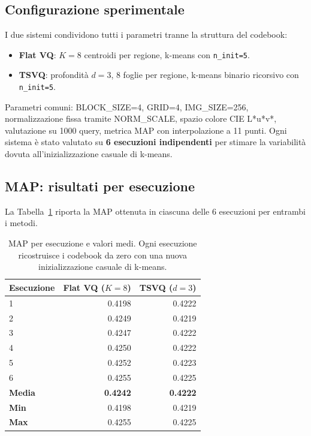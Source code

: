 \documentclass[12pt, a4paper]{article}
\begin{document}
\subsection{Configurazione sperimentale}

I due sistemi condividono tutti i parametri tranne la struttura del codebook:
\begin{itemize}
    \item \textbf{Flat VQ}: $K=8$ centroidi per regione, k-means con \texttt{n\_init=5}.
    \item \textbf{TSVQ}: profondità $d=3$, 8 foglie per regione, k-means binario ricorsivo
          con \texttt{n\_init=5}.
\end{itemize}
Parametri comuni: BLOCK\_SIZE=4, GRID=4, IMG\_SIZE=256, normalizzazione fissa tramite
NORM\_SCALE, spazio colore CIE L*u*v*, valutazione su 1000 query, metrica MAP con
interpolazione a 11 punti. Ogni sistema è stato valutato su \textbf{6 esecuzioni
indipendenti} per stimare la variabilità dovuta all'inizializzazione casuale di k-means.

\subsection{MAP: risultati per esecuzione}

La Tabella~\ref{tab:map_runs} riporta la MAP ottenuta in ciascuna delle 6 esecuzioni
per entrambi i metodi.

\begin{table}[H]
\centering
\begin{tabular}{lrr}
\toprule
\textbf{Esecuzione} & \textbf{Flat VQ ($K=8$)} & \textbf{TSVQ ($d=3$)} \\
\midrule
1 & 0.4198 & 0.4222 \\
2 & 0.4249 & 0.4219 \\
3 & 0.4247 & 0.4222 \\
4 & 0.4250 & 0.4222 \\
5 & 0.4252 & 0.4223 \\
6 & 0.4255 & 0.4225 \\
\midrule
\textbf{Media}  & \textbf{0.4242} & \textbf{0.4222} \\
\textbf{Min}    & 0.4198          & 0.4219 \\
\textbf{Max}    & 0.4255          & 0.4225 \\
\bottomrule
\end{tabular}
\caption{MAP per esecuzione e valori medi. Ogni esecuzione ricostruisce i codebook
da zero con una nuova inizializzazione casuale di k-means.}
\label{tab:map_runs}
\end{table}
\end{document}
